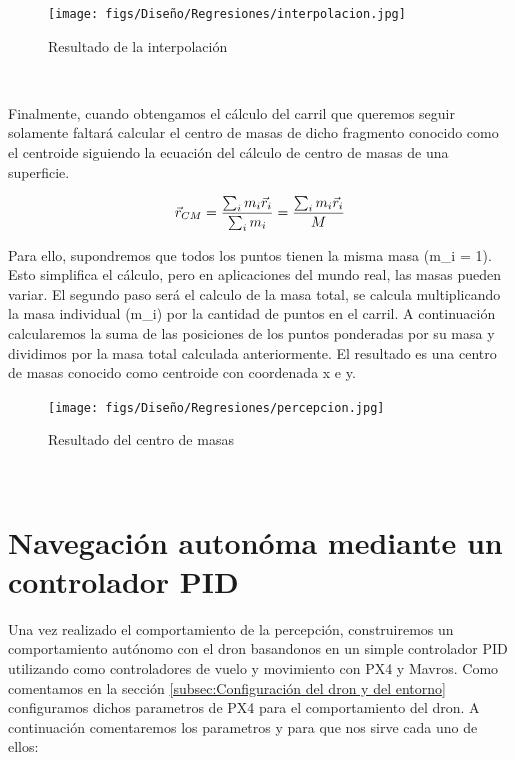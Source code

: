   \begin{figure} [H]
    \begin{center}
      \texttt{[image: figs/Diseño/Regresiones/interpolacion.jpg]}
    \end{center}
    \caption{Resultado de la interpolación}
    \label{fig:interpolación}
  \end{figure}\

  Finalmente, cuando obtengamos el cálculo del carril que queremos seguir solamente faltará calcular el centro de masas de dicho fragmento conocido como el centroide siguiendo la ecuación
  del cálculo de centro de masas de una superficie. \newline

  \begin{equation} 
    \vec{r}_{CM} = \frac{\sum_{i}m_{i} \vec{r}_{i}}{\sum_{i}m_{i}} = \frac{\sum_{i}m_{i} \vec{r}_{i}}{M} 
    \newline
  \end{equation} 
 
  Para ello, 
  supondremos que todos los puntos tienen la misma masa (m\_i = 1). Esto simplifica el cálculo, pero en aplicaciones del mundo real, las masas pueden variar.
  El segundo paso será el calculo de la masa total, se calcula multiplicando la masa individual (m\_i) por la cantidad de puntos en el carril. A continuación calcularemos
  la suma de las posiciones de los puntos ponderadas por su masa y dividimos por la masa total calculada anteriormente. El resultado es una centro de masas conocido como centroide
  con coordenada x e y. 

  \begin{figure} [H]
    \begin{center}
      \texttt{[image: figs/Diseño/Regresiones/percepcion.jpg]}
    \end{center}
    \caption{Resultado del centro de masas}
    \label{fig:centro de masas}
  \end{figure}\

  \section{Navegación autonóma mediante un controlador PID}
  \label{sec:Control}

  Una vez realizado el comportamiento de la percepción, construiremos un comportamiento autónomo con el dron basandonos en un simple controlador PID utilizando como controladores de vuelo
  y movimiento con PX4 y Mavros. 
  Como comentamos en la sección \ref{subsec:Configuración del dron y del entorno} configuramos dichos parametros de PX4 para el comportamiento del dron. A continuación comentaremos los parametros
  y para que nos sirve cada uno de ellos:

